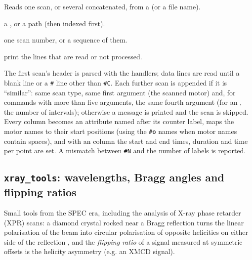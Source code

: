 Reads one scan, or several concatenated, from a  (or a file name).
\begin{args}
\item[spec\_file] a , or a path (then indexed first).
\item[scan\_numbers] one scan number, or a sequence of them.
\item[verbose] print the lines that are read or not processed.
\end{args}
 The first scan's header is parsed with the handlers; data lines are read until a
blank line or a \texttt{\#} line other than \texttt{\#C}. Each further scan is appended if it is
``similar'': same scan type, same first argument (the scanned motor) and, for commands with
more than five arguments, the same fourth argument (for an , the number of
intervals); otherwise a message is printed and the scan is skipped. Every column becomes an
attribute named after its counter label,  maps the motor names to their start
positions (using the \texttt{\#o} names when motor names contain spaces), and with an 
column the start and end times, duration and time per point are set. A mismatch between
\texttt{\#N} and the number of labels is reported.

\subsection{\texttt{xray\_tools}: wavelengths, Bragg angles and flipping ratios}

Small tools from the SPEC era, including the analysis of X-ray phase retarder (XPR) scans: a
diamond crystal rocked near a Bragg reflection turns the linear polarisation of the beam into
circular polarisation of opposite helicities on either side of the reflection
\citep{Hirano1991}, and the \emph{flipping ratio} of a signal measured at symmetric offsets is
the helicity asymmetry (e.g. an XMCD signal).

